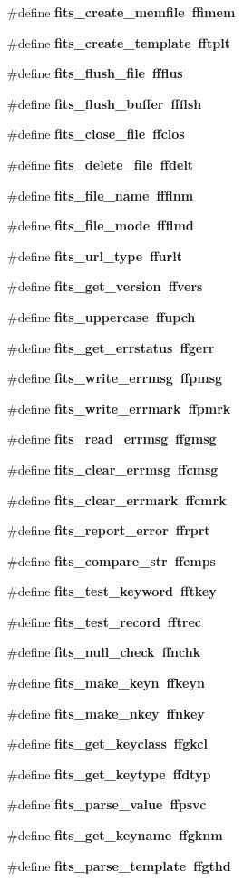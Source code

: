 \begin{CompactItemize}
\#define \bf{fits\_\-create\_\-memfile}~ffimem
\item 
\#define \bf{fits\_\-create\_\-template}~fftplt
\item 
\#define \bf{fits\_\-flush\_\-file}~ffflus
\item 
\#define \bf{fits\_\-flush\_\-buffer}~ffflsh
\item 
\#define \bf{fits\_\-close\_\-file}~ffclos
\item 
\#define \bf{fits\_\-delete\_\-file}~ffdelt
\item 
\#define \bf{fits\_\-file\_\-name}~ffflnm
\item 
\#define \bf{fits\_\-file\_\-mode}~ffflmd
\item 
\#define \bf{fits\_\-url\_\-type}~ffurlt
\item 
\#define \bf{fits\_\-get\_\-version}~ffvers
\item 
\#define \bf{fits\_\-uppercase}~ffupch
\item 
\#define \bf{fits\_\-get\_\-errstatus}~ffgerr
\item 
\#define \bf{fits\_\-write\_\-errmsg}~ffpmsg
\item 
\#define \bf{fits\_\-write\_\-errmark}~ffpmrk
\item 
\#define \bf{fits\_\-read\_\-errmsg}~ffgmsg
\item 
\#define \bf{fits\_\-clear\_\-errmsg}~ffcmsg
\item 
\#define \bf{fits\_\-clear\_\-errmark}~ffcmrk
\item 
\#define \bf{fits\_\-report\_\-error}~ffrprt
\item 
\#define \bf{fits\_\-compare\_\-str}~ffcmps
\item 
\#define \bf{fits\_\-test\_\-keyword}~fftkey
\item 
\#define \bf{fits\_\-test\_\-record}~fftrec
\item 
\#define \bf{fits\_\-null\_\-check}~ffnchk
\item 
\#define \bf{fits\_\-make\_\-keyn}~ffkeyn
\item 
\#define \bf{fits\_\-make\_\-nkey}~ffnkey
\item 
\#define \bf{fits\_\-get\_\-keyclass}~ffgkcl
\item 
\#define \bf{fits\_\-get\_\-keytype}~ffdtyp
\item 
\#define \bf{fits\_\-parse\_\-value}~ffpsvc
\item 
\#define \bf{fits\_\-get\_\-keyname}~ffgknm
\item 
\#define \bf{fits\_\-parse\_\-template}~ffgthd
\item 

\end{CompactItemize}
